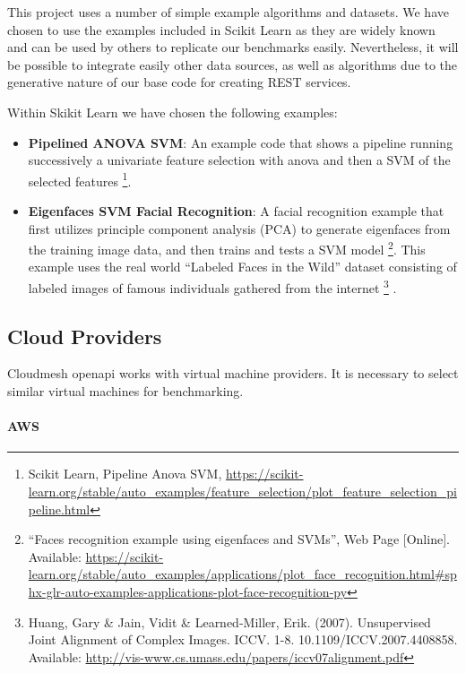This project uses a number of simple example algorithms and datasets. We
have chosen to use the examples included in Scikit Learn as they are
widely known and can be used by others to replicate our benchmarks
easily. Nevertheless, it will be possible to integrate easily other data
sources, as well as algorithms due to the generative nature of our base
code for creating REST services.

Within Skikit Learn we have chosen the following examples:

\begin{itemize}
\item
  \textbf{Pipelined ANOVA SVM}: An example code that shows a pipeline
  running successively a univariate feature selection with anova and
  then a SVM of the selected features \footnote{Scikit Learn, Pipeline
    Anova SVM,
    \url{https://scikit-learn.org/stable/auto_examples/feature_selection/plot_feature_selection_pipeline.html}}.
\item
  \textbf{Eigenfaces SVM Facial Recognition}: A facial recognition
  example that first utilizes principle component analysis (PCA) to
  generate eigenfaces from the training image data, and then trains and
  tests a SVM model \footnote{``Faces recognition example using
    eigenfaces and SVMs'', Web Page {[}Online{]}. Available:
    \url{https://scikit-learn.org/stable/auto_examples/applications/plot_face_recognition.html\#sphx-glr-auto-examples-applications-plot-face-recognition-py}}.
  This example uses the real world ``Labeled Faces in the Wild'' dataset
  consisting of labeled images of famous individuals gathered from the
  internet \footnote{Huang, Gary \& Jain, Vidit \& Learned-Miller, Erik.
    (2007). Unsupervised Joint Alignment of Complex Images. ICCV. 1-8.
    10.1109/ICCV.2007.4408858. Available:
    \url{http://vis-www.cs.umass.edu/papers/iccv07alignment.pdf}} .
\end{itemize}

\subsection{Cloud Providers}\label{cloud-providers}

Cloudmesh openapi works with virtual machine providers. It is necessary
to select similar virtual machines for benchmarking.

\hypertarget{aws}{%
\paragraph{AWS}\label{aws}}

